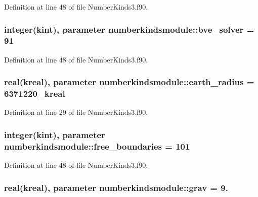 Definition at line 48 of file Number\+Kinds3.\+f90.

\hypertarget{classnumberkindsmodule_a0f39550048d794cfa17fae083fa8c144}{
\subsubsection[{bve\+\_\+solver}]{\setlength{\rightskip}{0pt plus 5cm}integer({\bf kint}), parameter numberkindsmodule\+::bve\+\_\+solver = 91}}\label{classnumberkindsmodule_a0f39550048d794cfa17fae083fa8c144}


Definition at line 48 of file Number\+Kinds3.\+f90.

\hypertarget{classnumberkindsmodule_a7a11e66fa6f857a8228f12a7c76ca69c}{
\subsubsection[{earth\+\_\+radius}]{\setlength{\rightskip}{0pt plus 5cm}real({\bf kreal}), parameter numberkindsmodule\+::earth\+\_\+radius = 6371220\+\_\+kreal}}\label{classnumberkindsmodule_a7a11e66fa6f857a8228f12a7c76ca69c}


Definition at line 29 of file Number\+Kinds3.\+f90.

\hypertarget{classnumberkindsmodule_a7e462ddc704343657b060034143bdabb}{
\subsubsection[{free\+\_\+boundaries}]{\setlength{\rightskip}{0pt plus 5cm}integer({\bf kint}), parameter numberkindsmodule\+::free\+\_\+boundaries = 101}}\label{classnumberkindsmodule_a7e462ddc704343657b060034143bdabb}


Definition at line 48 of file Number\+Kinds3.\+f90.

\hypertarget{classnumberkindsmodule_a3fa35bfeabc89820eedbd3cb234860c0}{
\subsubsection[{grav}]{\setlength{\rightskip}{0pt plus 5cm}real({\bf kreal}), parameter numberkindsmodule\+::grav = 9.}}\label{classnumberkindsmodule_a3fa35bfeabc89820eedbd3cb234860c0}


